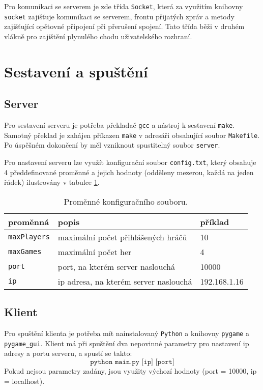 \documentclass[11pt,a4paper]{article}
\begin{document}
Pro komunikaci se serverem je zde třída \texttt{Socket}, která za využitím knihovny \texttt{socket} zajišťuje komunikaci se serverem, frontu přijatých zpráv a metody zajišťující opětovné připojení při přerušení spojení. Tato třída běži v druhém vlákně pro zajištění plynulého chodu uživatelského rozhraní.

\section{Sestavení a spuštění}
\subsection{Server}
Pro sestavení serveru je potřeba překladač \texttt{gcc} a nástroj k sestavení \texttt{make}. Samotný překlad je zahájen příkazen \texttt{make} v adresáři obsahující soubor \texttt{Makefile}. Po úspěšném dokončení by měl vzniknout spustitelný soubor \texttt{server}.

Pro nastavení serveru lze využít konfigurační soubor \texttt{config.txt}, který obsahuje 4 předdefinované proměnné a jejich hodnoty (odděleny mezerou, každá na jeden řádek) ilustrovány v tabulce \ref{tab:conf}.

\begin{table}
	\begin{center}
		\begin{tabular}[c]{l|l|l}
			proměnná & popis & příklad \\ \hline
			\texttt{maxPlayers} & maximální počet přihlášených hráčů & 10 \\
			\texttt{maxGames} & maximální počet her & 4 \\
			\texttt{port} & port, na kterém server naslouchá & 10000 \\
			\texttt{ip} & ip adresa, na kterém server naslouchá & 192.168.1.16 \\
		\end{tabular}
	\end{center}
	\caption{Proměnné konfiguračního souboru.}
	\label{tab:conf}
\end{table}

\subsection{Klient}
Pro spuštění klienta je potřeba mít nainstalovaný \texttt{Python} a knihovny \texttt{pygame} a \texttt{pygame\_gui}. Klient má při spuštění dva nepovinné parametry pro nastavení ip adresy a portu serveru, a spustí se takto:
$$ \texttt{python main.py [ip] [port]}$$
Pokud nejsou parametry zadány, jsou využity výchozí hodnoty (port = 10000, ip = localhost).
\end{document}

